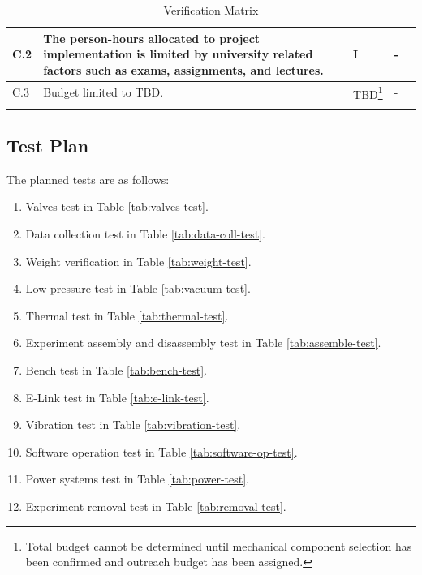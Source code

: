 \documentclass[a4paper,12pt,twoside]{article}
\begin{document}
\begin{longtable}[]{|m{}| m{} |m{} |m{}|m{}|}
C.2  & The person-hours allocated to project implementation is limited by university related factors such as exams, assignments, and lectures.                                 &      I        & -            &        \\ \hline
C.3  & Budget limited to TBD.                                                                                                                                                  &      TBD\footnote{Total budget cannot be determined until mechanical component selection has been confirmed and outreach budget has been assigned.}        & -            &        \\ \hline

\caption{Verification Matrix}
\label{tab:var-mat}
\end{longtable}
\raggedbottom
\pagebreak
\subsection{Test Plan}

The planned tests are as follows:

\begin{enumerate}
    \item Valves test in Table \ref{tab:valves-test}.
    \item Data collection test in Table \ref{tab:data-coll-test}.
    \item Weight verification in Table \ref{tab:weight-test}.
    \item Low pressure test in Table \ref{tab:vacuum-test}.
    \item Thermal test in Table \ref{tab:thermal-test}.
    \item Experiment assembly and disassembly test in Table \ref{tab:assemble-test}.
    \item Bench test in Table \ref{tab:bench-test}.
    \item E-Link test in Table \ref{tab:e-link-test}.
    \item Vibration test in Table \ref{tab:vibration-test}.
    \item Software operation test in Table \ref{tab:software-op-test}.
    \item Power systems test in Table \ref{tab:power-test}.
    \item Experiment removal test in Table \ref{tab:removal-test}.
\end{enumerate}

\renewcommand\thempfootnote{\arabic{mpfootnote}}
\end{document}

